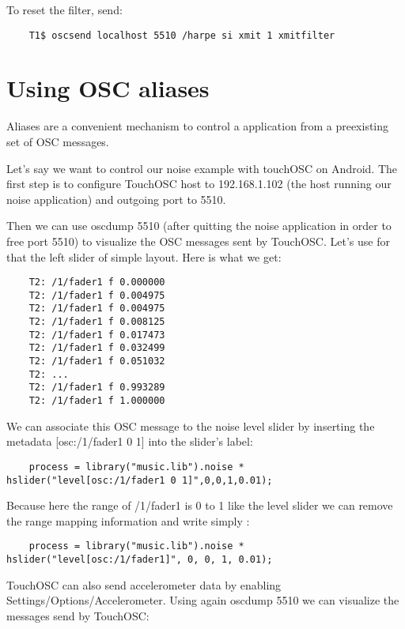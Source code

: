 To reset the filter, send:
\begin{lstlisting}
	T1$ oscsend localhost 5510 /harpe si xmit 1 xmitfilter
\end{lstlisting}

\section{Using OSC aliases}

Aliases are a convenient mechanism to control a \faust application from a preexisting set of OSC messages. 

Let's say we want to control our noise example with touchOSC on Android. The first step is to configure TouchOSC host to 192.168.1.102 (the host running our noise application) and outgoing port to 5510. 

Then we can use oscdump 5510 (after quitting the noise application in order to free port 5510) to visualize the OSC messages sent by TouchOSC. Let's use for that the left slider of simple layout. Here is what we get:

\begin{lstlisting}
	T2: /1/fader1 f 0.000000
	T2: /1/fader1 f 0.004975
	T2: /1/fader1 f 0.004975
	T2: /1/fader1 f 0.008125
	T2: /1/fader1 f 0.017473
	T2: /1/fader1 f 0.032499
	T2: /1/fader1 f 0.051032
	T2: ...
	T2: /1/fader1 f 0.993289
	T2: /1/fader1 f 1.000000
\end{lstlisting}

We can associate this OSC message to the noise level slider by inserting the metadata [osc:/1/fader1 0 1] into the slider's label:

\begin{lstlisting}
	process = library("music.lib").noise * hslider("level[osc:/1/fader1 0 1]",0,0,1,0.01);
\end{lstlisting}
	
Because here the range of /1/fader1 is 0 to 1 like the level slider we can remove the range mapping information and write simply :

\begin{lstlisting}
	process = library("music.lib").noise * hslider("level[osc:/1/fader1]", 0, 0, 1, 0.01);
\end{lstlisting}
	
TouchOSC can also send accelerometer data by enabling Settings/Options/Accelerometer. Using again oscdump 5510 we can visualize the messages send by TouchOSC:

